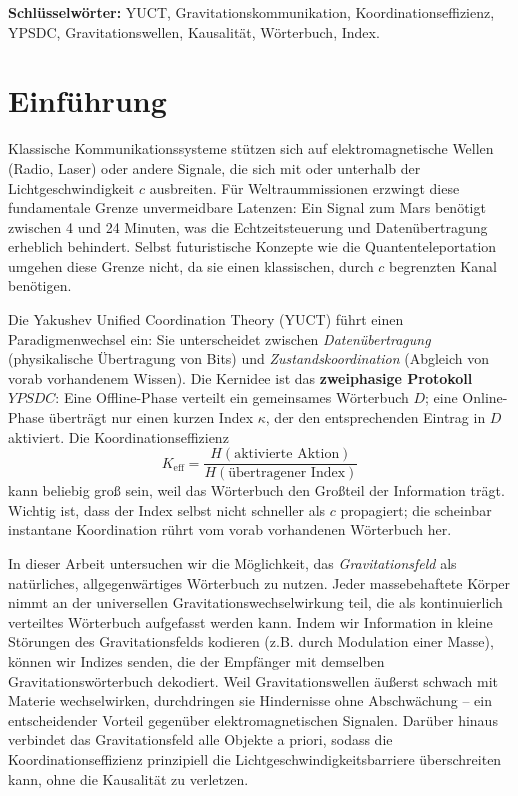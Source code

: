 \documentclass[12pt,a4paper]{article}
\newcommand{\Keff}{K_{\mathrm{eff}}}
\newcommand{\YPSDC}{YPSDC}
\begin{document}
\begin{titlepage}
\begin{center}
			\vspace{0.5cm}
			\noindent \textbf{Schlüsselwörter:} YUCT, Gravitationskommunikation, Koordinationseffizienz, YPSDC, Gravitationswellen, Kausalität, Wörterbuch, Index.
		\end{center}
	\end{titlepage}
	
	\tableofcontents
	\newpage
	
	\section{Einführung}
	\label{sec:intro}
	
	Klassische Kommunikationssysteme stützen sich auf elektromagnetische Wellen (Radio, Laser) oder andere Signale, die sich mit oder unterhalb der Lichtgeschwindigkeit \(c\) ausbreiten. Für Weltraummissionen erzwingt diese fundamentale Grenze unvermeidbare Latenzen: Ein Signal zum Mars benötigt zwischen 4 und 24 Minuten, was die Echtzeitsteuerung und Datenübertragung erheblich behindert. Selbst futuristische Konzepte wie die Quantenteleportation umgehen diese Grenze nicht, da sie einen klassischen, durch \(c\) begrenzten Kanal benötigen.
	
	Die Yakushev Unified Coordination Theory (YUCT) \cite{Yakushev2026} führt einen Paradigmenwechsel ein: Sie unterscheidet zwischen \emph{Datenübertragung} (physikalische Übertragung von Bits) und \emph{Zustandskoordination} (Abgleich von vorab vorhandenem Wissen). Die Kernidee ist das \textbf{zweiphasige Protokoll} \(\YPSDC\): Eine Offline-Phase verteilt ein gemeinsames Wörterbuch \(D\); eine Online-Phase überträgt nur einen kurzen Index \(\kappa\), der den entsprechenden Eintrag in \(D\) aktiviert. Die Koordinationseffizienz
	\begin{equation}
		\Keff = \frac{H(\text{aktivierte Aktion})}{H(\text{übertragener Index})}
	\end{equation}
	kann beliebig groß sein, weil das Wörterbuch den Großteil der Information trägt. Wichtig ist, dass der Index selbst nicht schneller als \(c\) propagiert; die scheinbar instantane Koordination rührt vom vorab vorhandenen Wörterbuch her.
	
	In dieser Arbeit untersuchen wir die Möglichkeit, das \emph{Gravitationsfeld} als natürliches, allgegenwärtiges Wörterbuch zu nutzen. Jeder massebehaftete Körper nimmt an der universellen Gravitationswechselwirkung teil, die als kontinuierlich verteiltes Wörterbuch aufgefasst werden kann. Indem wir Information in kleine Störungen des Gravitationsfelds kodieren (z.B. durch Modulation einer Masse), können wir Indizes senden, die der Empfänger mit demselben Gravitationswörterbuch dekodiert. Weil Gravitationswellen äußerst schwach mit Materie wechselwirken, durchdringen sie Hindernisse ohne Abschwächung – ein entscheidender Vorteil gegenüber elektromagnetischen Signalen. Darüber hinaus verbindet das Gravitationsfeld alle Objekte a priori, sodass die Koordinationseffizienz prinzipiell die Lichtgeschwindigkeitsbarriere überschreiten kann, ohne die Kausalität zu verletzen.
	
\end{document}
